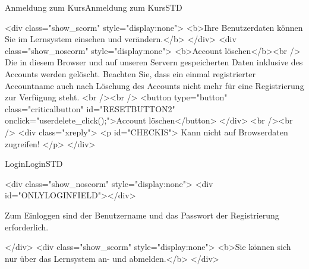 \begin{MXContent}{Anmeldung zum Kurs}{Anmeldung zum Kurs}{STD}
% 
% 

\begin{html}
<div class="show_scorm" style="display:none">
<b>Ihre Benutzerdaten können Sie im Lernsystem einsehen und verändern.</b>
</div>
<div class="show_noscorm" style="display:none">
<b>Account löschen</b><br />
Die in diesem Browser und auf unseren Servern gespeicherten Daten inklusive des Accounts werden gelöscht.
Beachten Sie, dass ein einmal registrierter Accountname auch nach Löschung des Accounts nicht mehr für eine Registrierung
zur Verfügung steht.
<br /><br />
<button type="button" class="criticalbutton" id="RESETBUTTON2" onclick="userdelete_click();">Account löschen</button>
</div>
<br /><br />
<div class="xreply">
<p id="CHECKIS">
Kann nicht auf Browserdaten zugreifen!
</p>
</div>
\end{html}


\end{MXContent}

\begin{MXContent}{Login}{Login}{STD}
\MGlobalLoginTag
{}
\begin{html}
<div class="show_noscorm" style="display:none">
<div id="ONLYLOGINFIELD"></div>
\end{html}

Zum Einloggen sind der Benutzername und das Passwort der Registrierung erforderlich.

\begin{html}
</div>
<div class="show_scorm" style="display:none">
<b>Sie können sich nur über das Lernsystem an- und abmelden.</b>
</div>
\end{html}

\end{MXContent}


